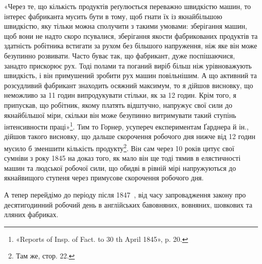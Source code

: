 
«Через те, що кількість продуктів реґулюється переважно
швидкістю машин, то інтерес фабриканта мусить бути в тому,
щоб гнати їх із якнайбільшою швидкістю, яку тільки можна
сполучити з такими умовами: зберігання машин, щоб вони не
надто скоро псувалися, зберігання якости фабрикованих продуктів
та здатність робітника встигати за рухом без більшого напруження,
ніж яке він може безупинно розвивати. Часто буває так,
що фабрикант, дуже поспішаючися, занадто прискорює рух.
Тоді полами та поганий виріб більш ніж урівноважують швидкість,
і він примушений зробити рух машин повільнішим. А що
активний та розсудливий фабрикант знаходить осяжний максимум,
то я дійшов висновку, що неможливо за 11 годин випродукувати
стільки, як за 12 годин. Крім того, я припускав, що робітник,
якому платять відштучно, напружує свої сили до якнайбільшої
міри, скільки він може безупинно витримувати такий
ступінь інтенсивности праці»\footnote{
«Reports of Insp. of Fact. to 30 th April 1845», p. 20.
}. Тим то Горнер, усупереч експериментам
Ґарднера й ін., дійшов такого висновку, що дальше скорочення
робочого дня нижче від 12 годин мусило б зменшити
кількість продукту\footnote{
Там же, стор. 22.
}. Він сам через 10 років цитує свої сумніви
з року 1845 на доказ того, як мало він ще тоді тямив в елястичності
машин та людської робочої сили, що обидві в рівній мірі
напружуються до якнайвищого ступеня через примусове скорочення
робочого дня.

А тепер перейдімо до періоду після 1847~, від часу запровадження
закону про десятигодинний робочий день в англійських
бавовняних, вовняних, шовкових та лляних фабриках.

